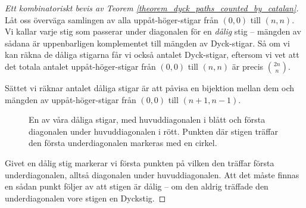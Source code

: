 \documentclass{tufte-handout}
\begin{document}
\begin{proof}[Ett kombinatoriskt bevis av Teorem \ref{theorem_dyck_paths_counted_by_catalan}]
    Låt oss överväga samlingen av alla uppåt-höger-stigar från $(0,0)$ till $(n,n)$. Vi kallar varje stig som passerar under diagonalen för en \emph{dålig} stig -- mängden av sådana är uppenbarligen komplementet till mängden av Dyck-stigar. Så om vi kan räkna de dåliga stigarna får vi också antalet Dyck-stigar, eftersom vi vet att det totala antalet uppåt-höger-stigar från $(0,0)$ till $(n,n)$ är precis $\binom{2n}{n}$.

    Sättet vi räknar antalet dåliga stigar är att påvisa en bijektion mellan dem och mängden av uppåt-höger-stigar från $(0,0)$ till $(n+1,n-1)$.

    \begin{figure}\label{fig:dyck_comb_proof_path}
        \centering
        \caption{En av våra dåliga stigar, med huvuddiagonalen i blått och första diagonalen under huvuddiagonalen i rött. Punkten där stigen träffar den första underdiagonalen markeras med en cirkel.}
    \end{figure}

    Givet en dålig stig markerar vi första punkten på vilken den träffar första underdiagonalen, alltså diagonalen under huvuddiagonalen. Att det måste finnas en sådan punkt följer av att stigen är dålig -- om den aldrig träffade den underdiagonalen vore stigen en Dyckstig.


\end{proof}
\end{document}
